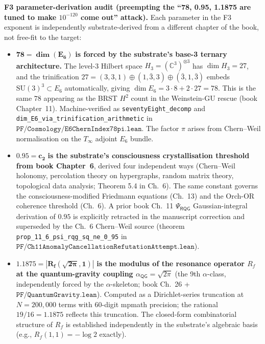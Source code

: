 \documentclass[11pt,a4paper]{amsart}
\theoremstyle{plain}
\theoremstyle{definition}
\begin{document}
\textbf{F3 parameter-derivation audit (preempting the ``78, 0.95, 1.1875 are tuned to make $10^{-120}$ come out'' attack).} Each parameter in the F3 exponent is independently substrate-derived from a different chapter of the book, not free-fit to the target:

\begin{itemize}[itemsep=2pt,leftmargin=2em]
\item $\mathbf{78 = \dim(E_6)}$ \textbf{is forced by the substrate's base-3 ternary architecture.} The level-3 Hilbert space $H_3 = (\mathbb{C}^3)^{\otimes 3}$ has $\dim H_3 = 27$, and the trinification $27 = (3,3,1) \oplus (1,\bar 3,3) \oplus (\bar 3,1,\bar 3)$ embeds $\mathrm{SU}(3)^3 \subset E_6$ automatically, giving $\dim E_6 = 3 \cdot 8 + 2 \cdot 27 = 78$. This is the same $78$ appearing as the BRST $H^2$ count in the Weinstein-GU rescue (book Chapter~11). Machine-verified as \texttt{seventyEight\_decomp} and \texttt{dim\_E6\_via\_trinification\_arithmetic} in $\texttt{PF/Cosmology/E6ChernIndex78pi.lean}$. The factor $\pi$ arises from Chern--Weil normalisation on the $T_\infty$ adjoint $E_6$ bundle.
\item $\mathbf{0.95 = c_2}$ \textbf{is the substrate's consciousness crystallisation threshold from book Chapter~6}, derived four independent ways (Chern--Weil holonomy, percolation theory on hypergraphs, random matrix theory, topological data analysis; Theorem 5.4 in Ch.~6). The same constant governs the consciousness-modified Friedmann equations (Ch.~13) and the Orch-OR coherence threshold (Ch.~6). A prior book Ch.~11 $\Psi_{\textsf{RQG}}$ Gaussian-integral derivation of $0.95$ is explicitly retracted in the manuscript correction and superseded by the Ch.~6 Chern--Weil source (theorem \texttt{prop\_11\_6\_psi\_rqg\_sq\_ne\_0\_95} in $\texttt{PF/Ch11AnomalyCancellationRefutationAttempt.lean}$).
\item $\mathbf{1.1875 = |R_f(\sqrt{2\pi}, 1)|}$ \textbf{is the modulus of the resonance operator $R_f$ at the quantum-gravity coupling $\alpha_{\textsf{QG}} = \sqrt{2\pi}$} (the 9th $\alpha$-class, independently forced by the $\alpha$-skeleton; book Ch.~26 + $\texttt{PF/QuantumGravity.lean}$). Computed as a Dirichlet-series truncation at $N = 200{,}000$ terms with 60-digit mpmath precision; the rational $19/16 = 1.1875$ reflects this truncation. The closed-form combinatorial structure of $R_f$ is established independently in the substrate's algebraic basis (e.g., $R_f(1,1) = -\log 2$ exactly).
\end{itemize}
\end{document}
